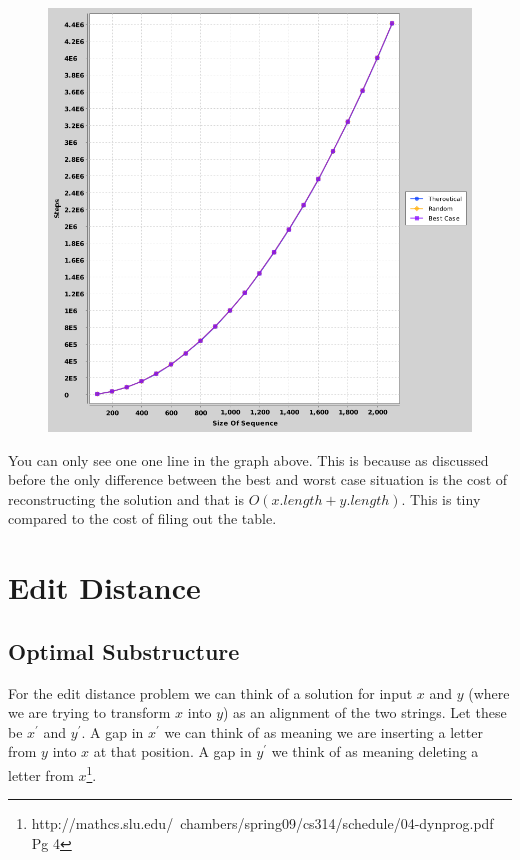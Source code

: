 \documentclass{article}
\begin{document}
					\begin{figure}[h]
						\vspace{3mm}
						\begin{center}
							\includegraphics[scale=0.4]{data.png}
						\end{center}
					\end{figure}
					
					
					You can only see one one line in the graph above. This is because as discussed before the only difference between the best and worst case situation is the cost of reconstructing the solution and that is $O(x.length + y.length)$. This is tiny compared to the cost of filing out the table.\newline
					
			\section{Edit Distance}		
				\subsection{Optimal Substructure}
					For the edit distance problem we can think of a solution for input $x$ and $y$ (where we are trying to transform $x$ into $y$) as an alignment of the two strings. Let these be $x^\prime$ and $y^\prime$. A gap in $x^\prime$ we can think of as meaning we are inserting a letter from $y$ into $x$ at that position. A gap in $y^\prime$ we think of as meaning deleting a letter from $x$\footnote{http://mathcs.slu.edu/~chambers/spring09/cs314/schedule/04-dynprog.pdf Pg 4}.\newline
					
\end{document}
